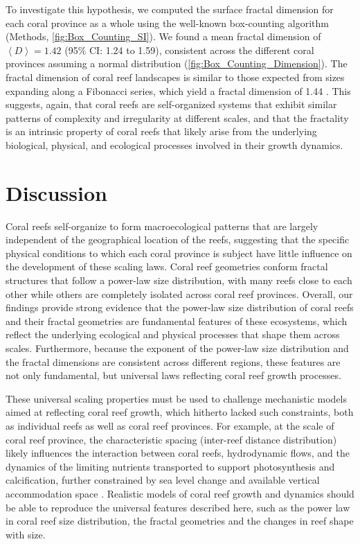 To investigate this hypothesis, we computed the surface fractal dimension
for each coral province as a whole using the well-known box-counting algorithm
(Methods, \cref{fig:Box_Counting_SI}). We found a mean fractal dimension
of
$\left<D\right>=1.42$ (95\% CI: 1.24 to 1.59), consistent across the different
coral provinces assuming a normal distribution
(\cref{fig:Box_Counting_Dimension}). The fractal dimension of coral reef
landscapes is similar to those expected from sizes expanding along a Fibonacci
series, which yield a fractal dimension of 1.44 \cite{Sorensen1998}. This
suggests, again, that coral reefs are self-organized systems that exhibit
similar patterns of complexity and irregularity at different scales, and that
the fractality is an intrinsic property of coral reefs that likely arise from
the underlying biological, physical, and ecological processes involved in their
growth dynamics.

\section{Discussion}

Coral reefs self-organize to form macroecological patterns that are largely
independent of the geographical location of the reefs, suggesting that the
specific physical conditions to which each coral province is subject have
little influence on the development of these scaling laws. Coral reef
geometries conform fractal structures that follow a power-law size
distribution, with many reefs close to each other while others are completely
isolated across coral reef provinces. Overall, our findings provide strong
evidence that the power-law size distribution of coral reefs and their fractal
geometries are fundamental features of these ecosystems, which reflect the
underlying ecological and physical processes that shape them across scales.
Furthermore, because the exponent of the power-law size distribution and the
fractal dimensions are consistent across different regions, these features are
not only fundamental, but universal laws reflecting coral reef growth
processes.

These universal scaling properties must be used to challenge mechanistic
models aimed at reflecting coral reef growth, which hitherto lacked such
constraints, both as individual reefs as well as coral reef provinces. For
example, at the scale of coral reef province, the characteristic spacing
(inter-reef distance distribution) likely influences the interaction between
coral reefs, hydrodynamic flows, and the dynamics of the limiting nutrients
transported to support photosynthesis and calcification, further constrained by
sea level change and available vertical accommodation space \cite{Nakamura2007,
    Mistr2003, Bosscher1992}. Realistic models of coral reef growth and
dynamics
should be able to reproduce the universal features described here, such as the
power law in coral reef size distribution, the fractal geometries and the
changes in reef shape with size.

